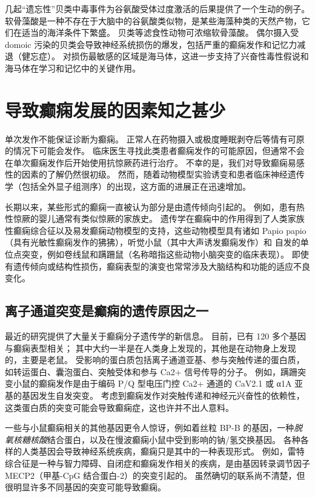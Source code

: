 几起“遗忘性”贝类中毒事件为谷氨酸受体过度激活的后果提供了一个生动的例子。
软骨藻酸是一种不存在于大脑中的谷氨酸类似物，是某些海藻种类的天然产物，它们在适当的海洋条件下繁盛。
贝类等滤食性动物可浓缩软骨藻酸。
偶尔摄入受 domoic 污染的贝类会导致神经系统损伤的爆发，包括严重的癫痫发作和记忆力减退（健忘症）。
对损伤最敏感的区域是海马体，这进一步支持了兴奋性毒性假说和海马体在学习和记忆中的关键作用。



\section{导致癫痫发展的因素知之甚少}

单次发作不能保证诊断为癫痫。
正常人在药物摄入或极度睡眠剥夺后等情有可原的情况下可能会发作。
临床医生寻找此类患者癫痫发作的可能原因，但通常不会在单次癫痫发作后开始使用抗惊厥药进行治疗。
不幸的是，我们对导致癫痫易感性的因素的了解仍然很初级。
然而，随着动物模型实验诱变和患者临床神经遗传学（包括全外显子组测序）的出现，这方面的进展正在迅速增加。


长期以来，某些形式的癫痫一直被认为部分是由遗传倾向引起的。
例如，患有热性惊厥的婴儿通常有类似惊厥的家族史。
遗传学在癫痫中的作用得到了人类家族性癫痫综合征以及易发癫痫动物模型的支持，这些动物模型具有诸如 Papio papio（具有光敏性癫痫发作的狒狒），听觉小鼠（其中大声诱发癫痫发作）和 自发的单位点突变，例如卷线鼠和蹒跚鼠（名称暗指这些动物小脑突变的临床表现）。
即使有遗传倾向或结构性损伤，癫痫表型的演变也常常涉及大脑结构和功能的适应不良变化。



\subsection{离子通道突变是癫痫的遗传原因之一}

最近的研究提供了大量关于癫痫分子遗传学的新信息。 目前，已有 120 多个基因与癫痫表型相关；
其中大约一半是在人类身上发现的，其他是在动物身上发现的，主要是老鼠。
受影响的蛋白质包括离子通道亚基、参与突触传递的蛋白质，如转运蛋白、囊泡蛋白、突触受体和参与 Ca2+ 信号传导的分子。
例如，蹒跚突变小鼠的癫痫发作是由于编码 P/Q 型电压门控 Ca2+ 通道的 CaV2.1 或 α1A 亚基的基因发生自发突变。
考虑到癫痫发作对突触传递和神经元兴奋性的依赖性，这类蛋白质的突变可能会导致癫痫症，这也许并不出人意料。


一些与小鼠癫痫相关的其他基因更令人惊讶，例如着丝粒 BP-B 的基因，一种\textit{脱氧核糖核酸}结合蛋白，以及在慢波癫痫小鼠中受到影响的钠/氢交换基因。
各种各样的人类基因会导致神经系统疾病，癫痫只是其中的一种表现形式。
例如，雷特综合征是一种与智力障碍、自闭症和癫痫发作相关的疾病，是由基因转录调节因子 MECP2（甲基-CpG 结合蛋白-2）的突变引起的。
虽然确切的联系尚不清楚，但很明显许多不同基因的突变可能导致癫痫。


